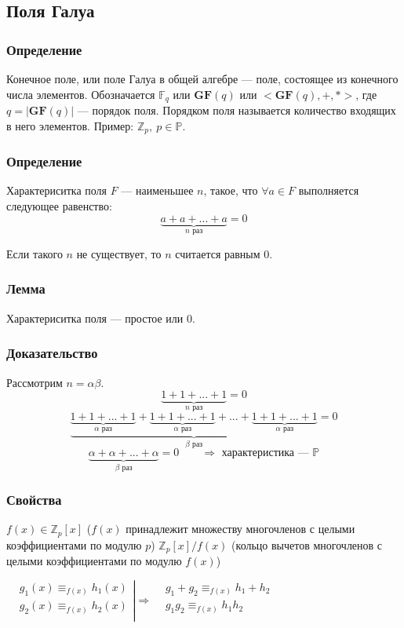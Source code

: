 \documentclass[12pt]{article}
\begin{document}
\subsection{Поля Галуа}
\subsubsection{Определение}
Конечное поле, или поле Галуа в общей алгебре — поле, состоящее из конечного числа элементов. Обозначается $\mathbb{F}_q$ или $\mathbf{GF}(q)$ или $<\mathbf{GF}(q), +, *>$, где $q = |\mathbf{GF}(q)|$ — порядок поля. Порядком поля называется количество входящих в него элементов. Пример: $\mathbb{Z}_p,\ p \in \mathbb{P}$.
\subsubsection{Определение}
Характериситка поля $F$ — наименьшее $n$, такое, что $\forall a \in F$ выполняется следующее равенство:
\[
    \underbrace{a + a + ... + a}_{n\text{ раз}} = 0
\]

Если такого $n$ не существует, то $n$ считается равным $0$.

\subsubsection{Лемма}
Характериситка поля — простое или $0$.
\subsubsection{Доказательство}
Рассмотрим $n = \alpha \beta$.
\[
    \underbrace{1 + 1 + ... + 1}_{n \text{ раз}} = 0
\]
\[
    \underbrace{\underbrace{1 + 1 + ... + 1}_{\alpha \text{ раз}} + \underbrace{1 + 1 + ... + 1}_{\alpha \text{ раз}} + ... + \underbrace{1 + 1 + ... + 1}_{\alpha \text{ раз}}}_{\beta \text{ раз}} = 0
\]
\[
    \underbrace{\alpha + \alpha + ... + \alpha}_{\beta \text{ раз}} = 0 \qquad \Rightarrow \text{ характеристика — } \mathbb{P}
\]
\subsubsection{Свойства}
$f(x) \in \mathbb{Z}_p[x]$ ($f(x)$ принадлежит множеству многочленов с целыми коэффициентами по модулю $p$)  $\mathbb{Z}_p[x] / f(x)$ (кольцо вычетов многочленов с целыми коэффициентами по модулю $f(x)$)

$
    \displaystyle
    \left.\begin{aligned}
         & g_1(x) \equiv_{f(x)} h_1(x) \\
         & g_2(x) \equiv_{f(x)} h_2(x) \\
    \end{aligned}\right| \Rightarrow \begin{aligned}
         & g_1 + g_2 \equiv_{f(x)} h_1 + h_2 \\
         & g_1g_2 \equiv_{f(x)} h_1h_2       \\
    \end{aligned}
$
\end{document}
